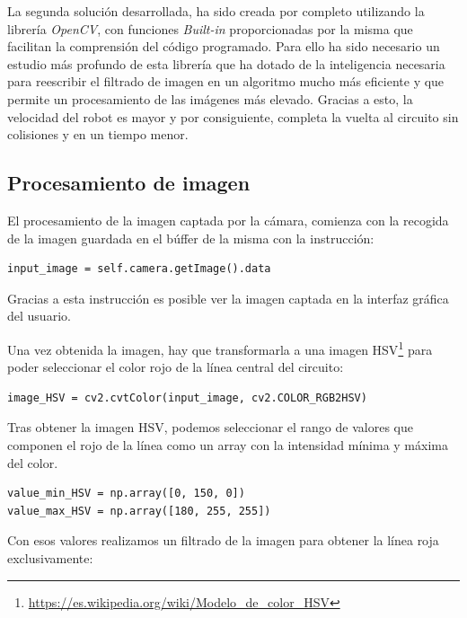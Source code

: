 La segunda solución desarrollada, ha sido creada por completo utilizando la librería \textit{OpenCV}, con funciones \textit{Built-in} proporcionadas por la misma que facilitan la comprensión del código programado. Para ello ha sido necesario un estudio más profundo de esta librería que ha dotado de la inteligencia necesaria para reescribir el filtrado de imagen en un algoritmo mucho más eficiente y que permite un procesamiento de las imágenes más elevado. Gracias a esto, la velocidad del robot es mayor y por consiguiente, completa la vuelta al circuito sin colisiones y en un tiempo menor.

\subsection{Procesamiento de imagen} \label{sec.pdi}
El procesamiento de la imagen captada por la cámara, comienza con la recogida de la imagen guardada en el búffer de la misma con la instrucción:

\lstset{language=Python, breaklines=true, basicstyle=\footnotesize}
\begin{lstlisting}[frame=single]
input_image = self.camera.getImage().data
\end{lstlisting}

Gracias a esta instrucción es posible ver la imagen captada en la interfaz gráfica del usuario.

Una vez obtenida la imagen, hay que transformarla a una imagen HSV\footnote{\url{https://es.wikipedia.org/wiki/Modelo_de_color_HSV}} para poder seleccionar el color rojo de la línea central del circuito:

\lstset{language=Python, breaklines=true, basicstyle=\footnotesize}
\begin{lstlisting}[frame=single]
image_HSV = cv2.cvtColor(input_image, cv2.COLOR_RGB2HSV)
\end{lstlisting}

Tras obtener la imagen HSV, podemos seleccionar el rango de valores que componen el rojo de la línea como un array con la intensidad mínima y máxima del color.

\lstset{language=Python, breaklines=true, basicstyle=\footnotesize}
\begin{lstlisting}[frame=single]
value_min_HSV = np.array([0, 150, 0])
value_max_HSV = np.array([180, 255, 255])
\end{lstlisting}

Con esos valores realizamos un filtrado de la imagen para obtener la línea roja exclusivamente:

